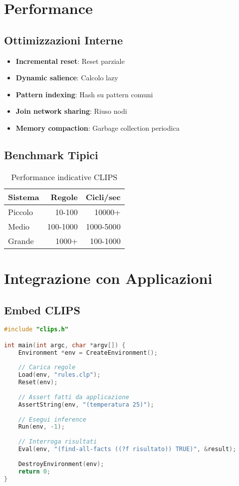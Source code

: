 \section{Performance}

\subsection{Ottimizzazioni Interne}

\begin{itemize}
\item \textbf{Incremental reset}: Reset parziale
\item \textbf{Dynamic salience}: Calcolo lazy
\item \textbf{Pattern indexing}: Hash su pattern comuni
\item \textbf{Join network sharing}: Riuso nodi
\item \textbf{Memory compaction}: Garbage collection periodica
\end{itemize}

\subsection{Benchmark Tipici}

\begin{table}[h]
\centering
\begin{tabular}{@{}lrr@{}}
\toprule
\textbf{Sistema} & \textbf{Regole} & \textbf{Cicli/sec} \\
\midrule
Piccolo & 10-100 & 10000+ \\
Medio & 100-1000 & 1000-5000 \\
Grande & 1000+ & 100-1000 \\
\bottomrule
\end{tabular}
\caption{Performance indicative CLIPS}
\end{table}

\section{Integrazione con Applicazioni}

\subsection{Embed CLIPS}

\begin{lstlisting}[language=C]
#include "clips.h"

int main(int argc, char *argv[]) {
    Environment *env = CreateEnvironment();
    
    // Carica regole
    Load(env, "rules.clp");
    Reset(env);
    
    // Assert fatti da applicazione
    AssertString(env, "(temperatura 25)");
    
    // Esegui inference
    Run(env, -1);
    
    // Interroga risultati
    Eval(env, "(find-all-facts ((?f risultato)) TRUE)", &result);
    
    DestroyEnvironment(env);
    return 0;
}
\end{lstlisting}

